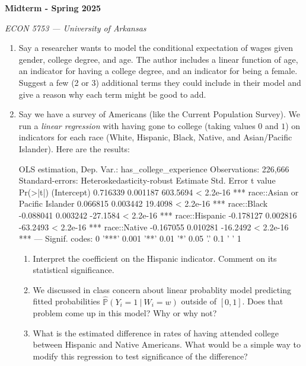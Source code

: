 \documentclass[12pt]{article}
\begin{document}
\begin{center}
  {\Huge\bf Midterm - Spring 2025}
  
  \smallskip
  {\large\it ECON 5753 — University of Arkansas}
\end{center}

\medskip
\begin{enumerate}
  \item Say a researcher wants to model the conditional expectation of wages given gender, college degree, and age. The author includes a linear function of age, an indicator for having a college degree, and an indicator for being a female. Suggest a few (2 or 3) additional terms they could include in their model and give a reason why each term might be good to add. 

  \bigskip
  \item Say we have a survey of Americans (like the Current Population Survey). We run a \emph{linear regression} with having gone to college (taking values $0$ and $1$) on indicators for each race (White, Hispanic, Black, Native, and Asian/Pacific Islander). Here are the results:
  \begin{codeblock}[{}]
OLS estimation, Dep. Var.: has_college_experience
Observations: 226,666
Standard-errors: Heteroskedasticity-robust 
                                 Estimate Std. Error  t value  Pr(>|t|)    
(Intercept)                      0.716339   0.001187 603.5694 < 2.2e-16 ***
race::Asian or Pacific Islander  0.066815   0.003442  19.4098 < 2.2e-16 ***
race::Black                     -0.088041   0.003242 -27.1584 < 2.2e-16 ***
race::Hispanic                  -0.178127   0.002816 -63.2493 < 2.2e-16 ***
race::Native                    -0.167055   0.010281 -16.2492 < 2.2e-16 ***
---
Signif. codes:  0 '***' 0.001 '**' 0.01 '*' 0.05 '.' 0.1 ' ' 1
  \end{codeblock}

  \begin{enumerate}
    \item Interpret the coefficient on the Hispanic indicator. Comment on its statistical significance.
    
    \item We discussed in class concern about linear probablity model predicting fitted probabilities $\hat{\mathbb{P}}( Y_i = 1 \ | \ W_i = w )$ outside of $[0, 1]$. Does that problem come up in this model? Why or why not?
    
    \item What is the estimated difference in rates of having attended college between Hispanic and Native Americans. What would be a simple way to modify this regression to test significance of the difference? 
  \end{enumerate}


\end{enumerate}
\end{document}
